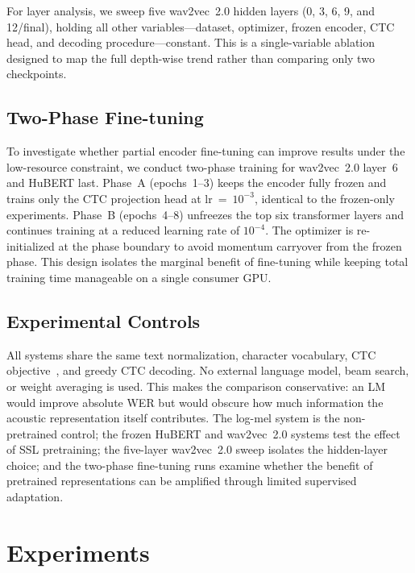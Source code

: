 \documentclass{article}
\begin{document}
For layer analysis, we sweep five wav2vec~2.0 hidden layers (0, 3, 6, 9, and
12/final), holding all other variables---dataset, optimizer, frozen encoder,
CTC head, and decoding procedure---constant. This is a single-variable ablation
designed to map the full depth-wise trend rather than comparing only two
checkpoints.

\subsection{Two-Phase Fine-tuning}

To investigate whether partial encoder fine-tuning can improve results under
the low-resource constraint, we conduct two-phase training for wav2vec~2.0
layer~6 and HuBERT last. Phase~A (epochs~1--3) keeps the encoder fully frozen
and trains only the CTC projection head at lr~=~$10^{-3}$, identical to the
frozen-only experiments. Phase~B (epochs~4--8) unfreezes the top six
transformer layers and continues training at a reduced learning rate of
$10^{-4}$. The optimizer is re-initialized at the phase boundary to avoid
momentum carryover from the frozen phase. This design isolates the marginal
benefit of fine-tuning while keeping total training time manageable on a
single consumer GPU.

\subsection{Experimental Controls}

All systems share the same text normalization, character vocabulary, CTC
objective~\cite{graves2006ctc}, and greedy CTC decoding. No external language
model, beam search, or weight averaging is used. This makes the comparison
conservative: an LM would improve absolute WER but would obscure how much
information the acoustic representation itself contributes. The log-mel system
is the non-pretrained control; the frozen HuBERT and wav2vec~2.0 systems test
the effect of SSL pretraining; the five-layer wav2vec~2.0 sweep isolates the
hidden-layer choice; and the two-phase fine-tuning runs examine whether the
benefit of pretrained representations can be amplified through limited
supervised adaptation.

\section{Experiments}
\end{document}
